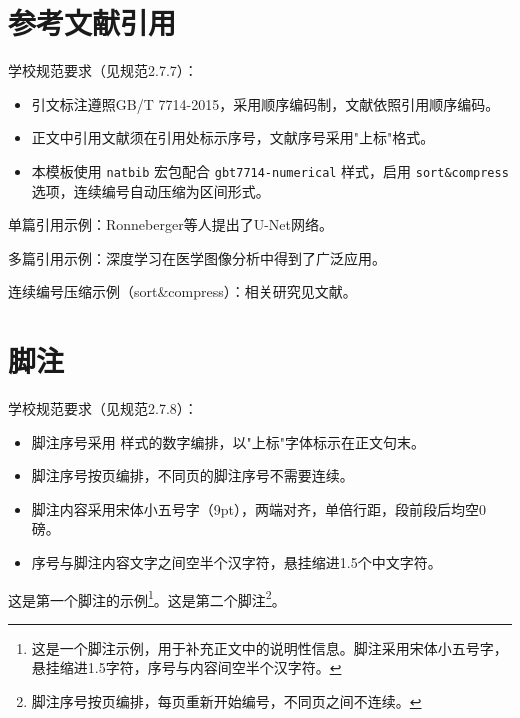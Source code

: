 \section{参考文献引用}\label{sec:demo-citations}

学校规范要求（见规范2.7.7）：

\begin{itemize}
  \item 引文标注遵照GB/T 7714-2015，采用顺序编码制，文献依照引用顺序编码。
  \item 正文中引用文献须在引用处标示序号，文献序号采用"上标"格式。
  \item 本模板使用 \verb|natbib| 宏包配合 \verb|gbt7714-numerical| 样式，启用 \verb|sort&compress| 选项，连续编号自动压缩为区间形式。
\end{itemize}

单篇引用示例：Ronneberger等人\cite{ronneberger2015unet}提出了U-Net网络。

多篇引用示例：深度学习在医学图像分析中得到了广泛应用\cite{ronneberger2015unet,goodfellow2014gan,he2016resnet}。

连续编号压缩示例（sort\&compress）：相关研究见文献\cite{ronneberger2015unet,goodfellow2014gan,he2016resnet,pan2010survey,lecun2015deeplearning,zhao2019review}。

\section{脚注}\label{sec:demo-footnotes}

学校规范要求（见规范2.7.8）：

\begin{itemize}
  \item 脚注序号采用  样式的数字编排，以"上标"字体标示在正文句末。
  \item 脚注序号按页编排，不同页的脚注序号不需要连续。
  \item 脚注内容采用宋体小五号字（9pt），两端对齐，单倍行距，段前段后均空0磅。
  \item 序号与脚注内容文字之间空半个汉字符，悬挂缩进1.5个中文字符。
\end{itemize}

这是第一个脚注的示例\footnote{这是一个脚注示例，用于补充正文中的说明性信息。脚注采用宋体小五号字，悬挂缩进1.5字符，序号与内容间空半个汉字符。}。这是第二个脚注\footnote{脚注序号按页编排，每页重新开始编号，不同页之间不连续。}。

